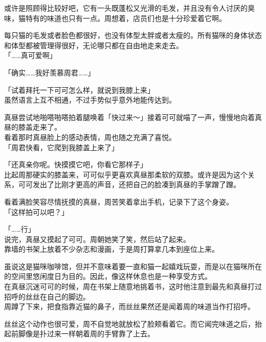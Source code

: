 或许是照顾得比较好吧，它有一头既蓬松又光滑的毛发，并且没有令人讨厌的臭味，猫特有的味道也只有一点。周想着，店员们也是十分珍爱着它啊。

每只猫的毛发或者脸色都很好，也没有体型太胖或者太瘦的。所有猫咪的身体状态和体型都被管理得很好，无论哪只都在自由地走来走去。\\

「……真可爱啊」

「确实……我好羡慕周君……」

「试着拜托一下可可怎么样，就说到我膝上来」\\

虽然语言上互不相通，不过手势似乎意外地能传达到。

真昼尝试地啪嗒啪嗒拍着腿唤着「快过来～」接着可可就喵了一声，慢慢地向着真昼的膝盖走来了。\\

看着那时真昼脸上的感动表情，周也随之充满了喜悦。\\

「周君快看，它爬到我膝盖上来了」

「还真亲你呢。快摸摸它吧，你看它那样子」\\

比起周那硬实的膝盖来，可可似乎更喜欢真昼那柔软的双膝。或许是因为这个关系，可可发出了比刚才更高的声音，还把自己的脸凑到真昼的手掌蹭了蹭。

看着满脸笑容尽情抚摸的真昼，周苦笑着拿出手机，记录下了这个身姿。\\

「这样拍可以吧？」

「……行」\\

说完，真昼又摸起了可可。周朝她笑了笑，然后站了起来。\\

靠墙的书架上放着不少杂志和漫画，于是周打算拿几本到座位上来。

虽说这是猫咪咖啡馆，但并不意味着要一直和猫一起嬉戏玩耍，而是以在猫咪所在的空间里悠闲度日为目的。因此，像这样休息也是一种享受方式。\\

在真昼沉迷可可的时候，周在书架上随意地挑着书，这时他注意到最先和真昼打过招呼的丝丝在自己的脚边。\\

周蹲了下来，把食指靠近猫的鼻子，而丝丝果然还是闻着周的味道当作打招呼。

丝丝这个动作也很可爱，周不自觉地就放松了脸颊看着它。而它闻完味道之后，抬起前脚像是扑过来一样朝着周的手臂靠了上去。\\

